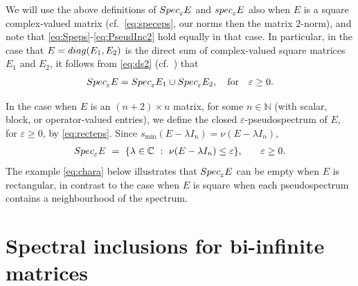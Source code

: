 \documentclass[preprint,1p,11pt]{elsarticle}
\newcommand\C{{\mathbb C}}
\newcommand\N{{\mathbb N}}
\newcommand\eps{{\varepsilon}}
\newcommand\speps{{\rm spec}_\eps}
\newcommand\Speps{{\rm Spec}_\eps}
\newcommand\diag{{\rm diag}}
\numberwithin{equation}{section}   %
\numberwithin{figure}{section}  %
\begin{document}
We will use the above definitions of $\Speps E$ and $\speps E$ also when $E$ is a square complex-valued matrix (cf.~\eqref{eq:speceps}, our norms then the matrix $2$-norm), and note that \eqref{eq:Speps}-\eqref{eq:PseudInc2} hold equally in that case. In particular, in the case that $E=\diag(E_1,E_2)$ is the direct sum of complex-valued square matrices $E_1$ and $E_2$, it follows from \eqref{eq:ds2} (cf.~\cite[Thm.~2.4]{TrefEmbBook}) that
\begin{equation} \label{eq:ds}
\Speps E = \Speps E_1 \cup \Speps E_2, \quad \mbox{for} \quad \eps\geq 0.
\end{equation}

In the case when $E$ is an $(n+2)\times n$ matrix, for some $n\in \N$ (with scalar, block, or operator-valued entries), we define the closed $\eps$-pseudospectrum of $E$, for $\eps\geq 0$, by \eqref{eq:recteps}. %
 Since $s_{\min}(E-\lambda I_n)=\nu(E-\lambda I_n)$,
\begin{equation} \label{eq:speps.rect}
\begin{array}{ccc}
\Speps E\ =\ \{\lambda\in\C\ :\ \nu(E-\lambda I_n)\le\eps\},&&\eps\ge 0.
\end{array}
\end{equation}
The example \eqref{eq:chara} below illustrates that %
$\Speps E$ can be empty when $E$ is rectangular, in contrast to the case when $E$ is square when each pseudospectrum contains a neighbourhood of the spectrum.

\section{Spectral inclusions for bi-infinite matrices} \label{sec:bi}
\end{document}
